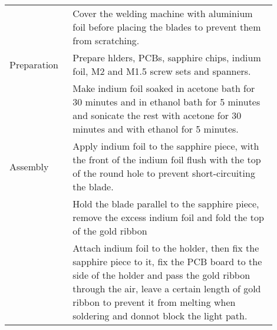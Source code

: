 \begin{table}
\begin{tabular}{p{0.2\linewidth}p{0.7\linewidth}}
                     & Cover the welding machine with aluminium foil before placing the blades to prevent them from scratching.                                                                                                                                                                    \\
        Preparation  & Prepare hlders, PCBs, sapphire chips, indium foil, M2 and M1.5 screw sets and spanners.                                                                                                                                                                                     \\
                     & Make indium foil soaked in acetone bath for 30 minutes and in ethanol bath for 5 minutes and sonicate the rest with acetone for 30 minutes and with ethanol for 5 minutes.                                                                                                  \\
        Assembly     & Apply indium foil to the sapphire piece, with the front of the indium foil flush with the top of the round hole to prevent short-circuiting the blade.                                                                                                                      \\
                     & Hold the blade parallel to the sapphire piece, remove the excess indium foil and fold the top of the gold ribbon                                                                                                                                                            \\
                     & Attach indium foil to the holder, then fix the sapphire piece to it, fix the PCB board to the side of the holder and pass the gold ribbon through the air, leave a certain length of gold ribbon to prevent it from melting when soldering and donnot block the light path. \\
        \bottomrule
    \end{tabular}
\end{table}

